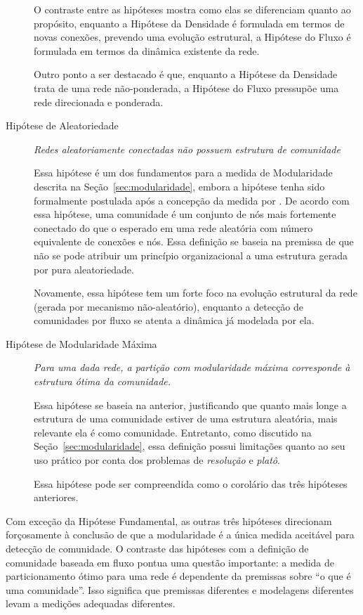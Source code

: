 \documentclass[12pt,a4paper]{article}
\begin{document}
\begin{description}
O contraste entre as hipóteses mostra como elas se diferenciam quanto ao propósito, enquanto a Hipótese da Densidade é formulada em termos de novas conexões, prevendo uma evolução estrutural, a Hipótese do Fluxo é formulada em termos da dinâmica existente da rede.

Outro ponto a ser destacado é que, enquanto a Hipótese da Densidade trata de uma rede não-ponderada, a Hipótese do Fluxo pressupõe uma rede direcionada e ponderada.

\item [Hipótese de Aleatoriedade] \textit{Redes aleatoriamente conectadas não possuem estrutura de comunidade}

Essa hipótese é um dos fundamentos para a medida de Modularidade descrita na Seção~\ref{sec:modularidade}, embora a hipótese tenha sido formalmente postulada após a concepção da medida por . De acordo com essa hipótese, uma comunidade é um conjunto de nós mais fortemente conectado do que o esperado em uma rede aleatória com número equivalente de conexões e nós. Essa definição se baseia na premissa de que não se pode atribuir um princípio organizacional a uma estrutura gerada por pura aleatoriedade.

Novamente, essa hipótese tem um forte foco na evolução estrutural da rede (gerada por mecanismo não-aleatório), enquanto a detecção de comunidades por fluxo se atenta a dinâmica já modelada por ela.

\item [Hipótese de Modularidade Máxima] \textit{Para uma dada rede, a partição com modularidade máxima corresponde à estrutura ótima da comunidade.}

Essa hipótese se baseia na anterior, justificando que quanto mais longe a estrutura de uma comunidade estiver de uma estrutura aleatória, mais relevante ela é como comunidade. Entretanto, como discutido na Seção~\ref{sec:modularidade}, essa definição possui limitações quanto ao seu uso prático por conta dos problemas de \textit{resolução} e \textit{platô}.

Essa hipótese pode ser compreendida como o corolário das três hipóteses anteriores. 

\end{description}

Com exceção da Hipótese Fundamental, as outras três hipóteses direcionam forçosamente à conclusão de que a modularidade é a única medida aceitável para detecção de comunidade. O contraste das hipóteses com a definição de comunidade baseada em fluxo pontua uma questão importante: a medida de particionamento ótimo para uma rede é dependente da premissas sobre \enquote{o que é uma comunidade}. Isso significa que premissas diferentes e modelagens diferentes levam a medições adequadas diferentes.
\end{document}
